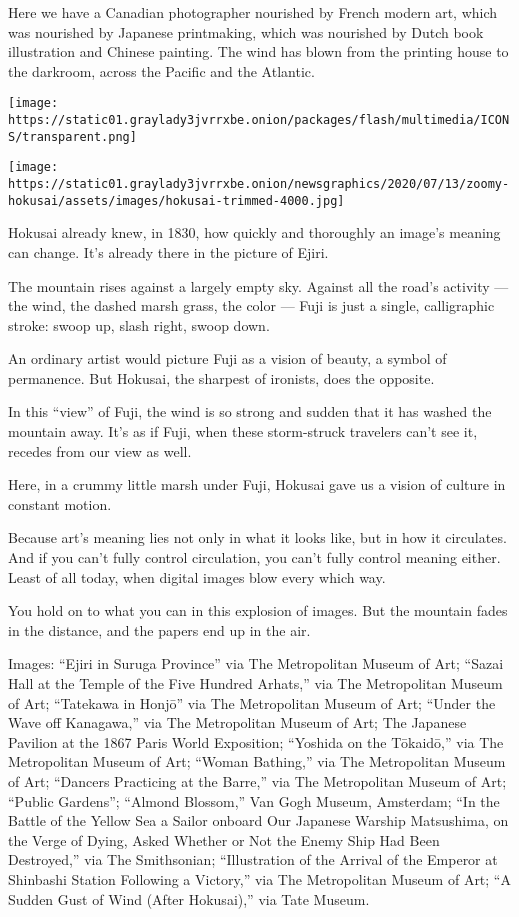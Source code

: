 Here we have a Canadian photographer nourished by French modern art,
which was nourished by Japanese printmaking, which was nourished by
Dutch book illustration and Chinese painting. The wind has blown from
the printing house to the darkroom, across the Pacific and the Atlantic.

\texttt{[image: https://static01.graylady3jvrrxbe.onion/packages/flash/multimedia/ICONS/transparent.png]}

\texttt{[image: https://static01.graylady3jvrrxbe.onion/newsgraphics/2020/07/13/zoomy-hokusai/assets/images/hokusai-trimmed-4000.jpg]}

Hokusai already knew, in 1830, how quickly and thoroughly an image's
meaning can change. It's already there in the picture of Ejiri.

The mountain rises against a largely empty sky. Against all the road's
activity --- the wind, the dashed marsh grass, the color --- Fuji is
just a single, calligraphic stroke: swoop up, slash right, swoop down.

An ordinary artist would picture Fuji as a vision of beauty, a symbol of
permanence. But Hokusai, the sharpest of ironists, does the opposite.

In this ``view'' of Fuji, the wind is so strong and sudden that it has
washed the mountain away. It's as if Fuji, when these storm-struck
travelers can't see it, recedes from our view as well.

Here, in a crummy little marsh under Fuji, Hokusai gave us a vision of
culture in constant motion.

Because art's meaning lies not only in what it looks like, but in how it
circulates. And if you can't fully control circulation, you can't fully
control meaning either. Least of all today, when digital images blow
every which way.

You hold on to what you can in this explosion of images. But the
mountain fades in the distance, and the papers end up in the air.

Images: ``Ejiri in Suruga Province'' via The Metropolitan Museum of Art;
``Sazai Hall at the Temple of the Five Hundred Arhats,'' via The
Metropolitan Museum of Art; ``Tatekawa in Honjō'' via The Metropolitan
Museum of Art; ``Under the Wave off Kanagawa,'' via The Metropolitan
Museum of Art; The Japanese Pavilion at the 1867 Paris World Exposition;
``Yoshida on the Tōkaidō,'' via The Metropolitan Museum of Art; ``Woman
Bathing,'' via The Metropolitan Museum of Art; ``Dancers Practicing at
the Barre,'' via The Metropolitan Museum of Art; ``Public Gardens'';
``Almond Blossom,'' Van Gogh Museum, Amsterdam; ``In the Battle of the
Yellow Sea a Sailor onboard Our Japanese Warship Matsushima, on the
Verge of Dying, Asked Whether or Not the Enemy Ship Had Been
Destroyed,'' via The Smithsonian; ``Illustration of the Arrival of the
Emperor at Shinbashi Station Following a Victory,'' via The Metropolitan
Museum of Art; ``A Sudden Gust of Wind (After Hokusai),'' via Tate
Museum.

